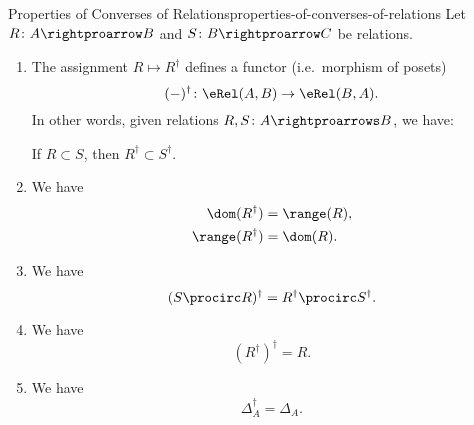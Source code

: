\begin{proposition}{Properties of Converses of Relations}{properties-of-converses-of-relations}%
    Let $R\colon A\rightproarrow B$ and $S\colon B\rightproarrow C$ be relations.
    \begin{enumerate}
        \item\label{properties-of-converses-of-relations-functoriality}The assignment $R\mapsto R^{\dagger}$ defines a functor (i.e.\ morphism of posets)
            \[
                (-)^{\dagger}%
                \colon%
                \eRel(A,B)%
                \to%
                \eRel(B,A).%
            \]%
            In other words, given relations $R,S\colon A\rightproarrows B$, we have:
            \begin{itemize}
                \itemstar If $R\subset S$, then $R^{\dagger}\subset S^{\dagger}$.
            \end{itemize}
        \item\label{properties-of-converses-of-relations-interaction-with-ranges-and-domains}We have
            \begin{align*}
                \dom(R^{\dagger})   &= \range(R),\\
                \range(R^{\dagger}) &= \dom(R).
            \end{align*}
        \item\label{properties-of-converses-of-relations-interaction-with-composition}We have
            \[
                (S\procirc R)^{\dagger}
                =
                R^{\dagger}\procirc S^{\dagger}.
            \]%
        \item\label{properties-of-converses-of-relations-invertibility}We have
            \[
                (R^{\dagger})^{\dagger}
                =
                R.
            \]%
        \item\label{properties-of-converses-of-relations-identity}We have
            \[
                \Delta^{\dagger}_{A}
                =
                \Delta_{A}.
            \]%
    \end{enumerate}
\end{proposition}
